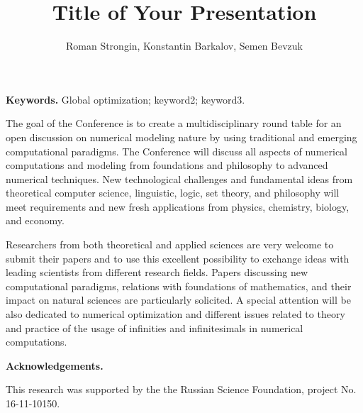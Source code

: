\documentclass[oribibl]{llncs}
\begin{document}
\cleardoublepage

\title{Title of Your Presentation}
\author{Roman Strongin, Konstantin Barkalov, Semen Bevzuk}



\maketitle

\thispagestyle{fancy}

\textbf{Keywords.} Global optimization; keyword2; keyword3.

 \vspace*{0.5cm}


The goal of the Conference is to create a multidisciplinary round
table for an open discussion on numerical modeling nature by using
traditional and emerging computational paradigms. The Conference
will discuss all aspects of numerical computations and modeling from
foundations and philosophy to advanced numerical techniques. New
technological challenges and fundamental ideas from theoretical
computer science, linguistic, logic, set theory, and philosophy will
meet requirements and new fresh applications from physics,
chemistry, biology, and economy.

Researchers from both theoretical and applied sciences are very
welcome to submit their papers and to use this excellent possibility
to exchange ideas with leading scientists from different research
fields. Papers discussing new computational paradigms, relations
with foundations of mathematics, and their impact on natural
sciences are particularly solicited. A special attention will be
also dedicated to numerical optimization and different issues
related to theory and practice of the usage of infinities and
infinitesimals in numerical computations.


\textbf{Acknowledgements.}

This research was supported by the the Russian Science Foundation, project No.\,16-11-10150.

\vspace{0.5cm}
\end{document}
